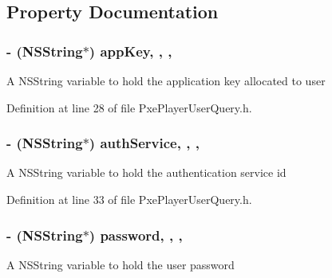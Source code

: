 \subsection{Property Documentation}
\hypertarget{interface_pxe_player_user_query_a17fa74296f432b038ab0836dd88522dd}{
\subsubsection[{app\-Key}]{\setlength{\rightskip}{0pt plus 5cm}-\/ (N\-S\-String$\ast$) app\-Key\hspace{0.3cm}{\ttfamily [read]}, {\ttfamily [write]}, {\ttfamily [nonatomic]}, {\ttfamily [strong]}}}\label{interface_pxe_player_user_query_a17fa74296f432b038ab0836dd88522dd}
A N\-S\-String variable to hold the application key allocated to user 

Definition at line 28 of file Pxe\-Player\-User\-Query.\-h.

\hypertarget{interface_pxe_player_user_query_ad2148702ba3de2059955adfa2aca351f}{
\subsubsection[{auth\-Service}]{\setlength{\rightskip}{0pt plus 5cm}-\/ (N\-S\-String$\ast$) auth\-Service\hspace{0.3cm}{\ttfamily [read]}, {\ttfamily [write]}, {\ttfamily [nonatomic]}, {\ttfamily [strong]}}}\label{interface_pxe_player_user_query_ad2148702ba3de2059955adfa2aca351f}
A N\-S\-String variable to hold the authentication service id 

Definition at line 33 of file Pxe\-Player\-User\-Query.\-h.

\hypertarget{interface_pxe_player_user_query_a604f4e6bdef2df7f04dee81ad1e969d3}{
\subsubsection[{password}]{\setlength{\rightskip}{0pt plus 5cm}-\/ (N\-S\-String$\ast$) password\hspace{0.3cm}{\ttfamily [read]}, {\ttfamily [write]}, {\ttfamily [nonatomic]}, {\ttfamily [strong]}}}\label{interface_pxe_player_user_query_a604f4e6bdef2df7f04dee81ad1e969d3}
A N\-S\-String variable to hold the user password 

